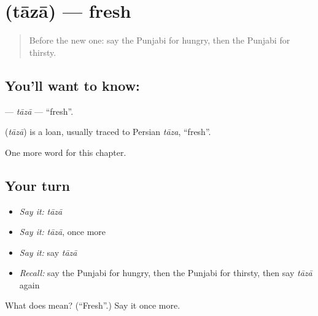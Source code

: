 \section[\texorpdfstring{\pa{ਤਾਜ਼ਾ} (tāzā)}{ਤਾਜ਼ਾ (tāzā)}]{ (tāzā) — fresh}

\label{lesson:PA-C145-taza}



\begin{quote}
Before the new one: say the Punjabi for hungry, then the Punjabi for thirsty.
\end{quote}

\subsection*{You'll want to know: }
\textbf{} — \emph{tāzā} — \textquotedblleft{}fresh\textquotedblright{}.

\begin{cousinweb}
\textbf{} (\emph{tāzā}) is a loan, usually traced to Persian \emph{tāza}, \textquotedblleft{}fresh\textquotedblright{}.
\end{cousinweb}

\begin{grammarlens}[title={What you've built}]
One more word for this chapter.
\end{grammarlens}

\subsection*{Your turn}
\begin{itemize}
\raggedright
  \item \emph{Say it:} \emph{tāzā}
  \item \emph{Say it:} \emph{tāzā}, once more
  \item \emph{Say it:} say \emph{tāzā}
  \item \emph{Recall:} say the Punjabi for hungry, then the Punjabi for thirsty, then say \emph{tāzā} again
\end{itemize}

\begin{tcolorbox}[breakable,colback=teal!4,colframe=teal!35!black,title={Before you move on}]
What does  mean? (\textquotedblleft{}Fresh\textquotedblright{}.) Say it once more.
\end{tcolorbox}
